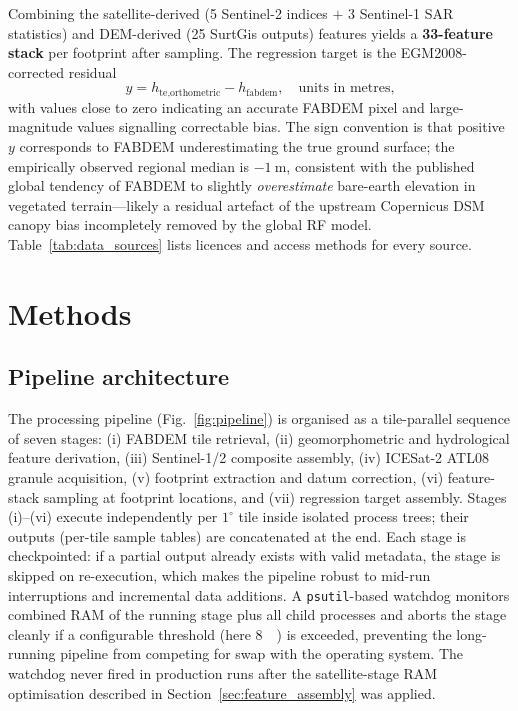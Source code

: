 \documentclass[preprint,authoryear,number]{elsarticle}
\begin{document}
Combining the satellite-derived (5 Sentinel-2 indices $+$ 3 Sentinel-1 SAR statistics) and DEM-derived (25 SurtGis outputs) features yields a \textbf{33-feature stack} per footprint after sampling. The regression target is the EGM2008-corrected residual
\begin{equation}
y = h_{\text{te,orthometric}} - h_{\text{fabdem}}, \quad \text{units in metres,}
\label{eq:target}
\end{equation}
with values close to zero indicating an accurate FABDEM pixel and large-magnitude values signalling correctable bias. The sign convention is that positive $y$ corresponds to FABDEM underestimating the true ground surface; the empirically observed regional median is $-\SI{1}{\meter}$, consistent with the published global tendency of FABDEM to slightly \emph{overestimate} bare-earth elevation in vegetated terrain---likely a residual artefact of the upstream Copernicus DSM canopy bias incompletely removed by the global RF model. Table~\ref{tab:data_sources} lists licences and access methods for every source.




\section{Methods}
\label{sec:methods}

\subsection{Pipeline architecture}
\label{sec:pipeline}

The processing pipeline (Fig.~\ref{fig:pipeline}) is organised as a tile-parallel sequence of seven stages: (i) FABDEM tile retrieval, (ii) geomorphometric and hydrological feature derivation, (iii) Sentinel-1/2 composite assembly, (iv) ICESat-2 ATL08 granule acquisition, (v) footprint extraction and datum correction, (vi) feature-stack sampling at footprint locations, and (vii) regression target assembly. Stages (i)--(vi) execute independently per $1^{\circ}$ tile inside isolated process trees; their outputs (per-tile sample tables) are concatenated at the end. Each stage is checkpointed: if a partial output already exists with valid metadata, the stage is skipped on re-execution, which makes the pipeline robust to mid-run interruptions and incremental data additions. A \texttt{psutil}-based watchdog monitors combined RAM of the running stage plus all child processes and aborts the stage cleanly if a configurable threshold (here \SI{8}{\giga\byte}) is exceeded, preventing the long-running pipeline from competing for swap with the operating system. The watchdog never fired in production runs after the satellite-stage RAM optimisation described in Section~\ref{sec:feature_assembly} was applied.
\end{document}
